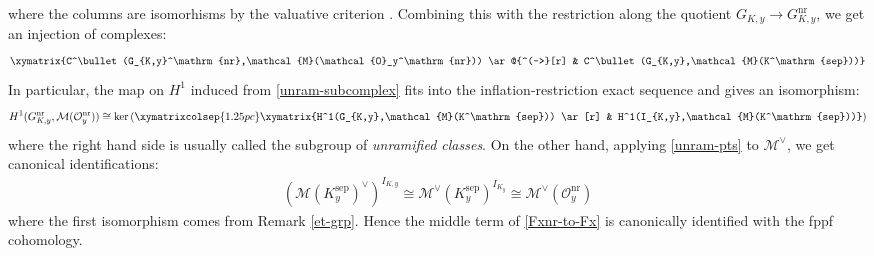 \documentclass[a4paper]{amsart}
\theoremstyle{definition}
\numberwithin{equation}{section}
\begin{document}
where the columns are isomorhisms by the valuative criterion \cite[\href{https://stacks.math.columbia.edu/tag/0BX5}{Tag 0BX5}]{Stacks}. Combining this with the restriction along the quotient $G_{K,y}\rightarrow G_{K,y}^\mathrm{nr}$, we get an injection of complexes:
\begin{align}\label{unram-subcomplex}
    \xymatrix{C^\bullet(G_{K,y}^\mathrm{nr},\mathcal{M}(\mathcal{O}_y^\mathrm{nr})) \ar@{^(->}[r] & C^\bullet(G_{K,y},\mathcal{M}(K^\mathrm{sep}))}
\end{align}
In particular, the map on $H^1$ induced from \eqref{unram-subcomplex} fits into the inflation-restriction exact sequence \cite[Corollary 2.4.2]{NSW08} and gives an isomorphism:
\begin{align*}
    H^1(G_{K,y}^\mathrm{nr},\mathcal{M}(\mathcal{O}_y^\mathrm{nr}))\cong\ker\left(\xymatrixcolsep{1.25pc}\xymatrix{H^1(G_{K,y},\mathcal{M}(K^\mathrm{sep})) \ar[r] & H^1(I_{K,y},\mathcal{M}(K^\mathrm{sep}))}\right)
\end{align*}
where the right hand side is usually called the subgroup of \emph{unramified classes}. On the other hand, applying \eqref{unram-pts} to $\mathcal{M}^\vee$, we get canonical identifications:
\begin{align*}
    (\mathcal{M}(K_y^\mathrm{sep})^\vee)^{I_{K,y}}\cong\mathcal{M}^\vee(K_y^\mathrm{sep})^{I_{K_y}}\cong\mathcal{M}^\vee(\mathcal{O}_y^\mathrm{nr})
\end{align*}
where the first isomorphism comes from Remark \ref{et-grp}. Hence the middle term of \ref{Fxnr-to-Fx} is canonically identified with the fppf cohomology.
\end{document}

